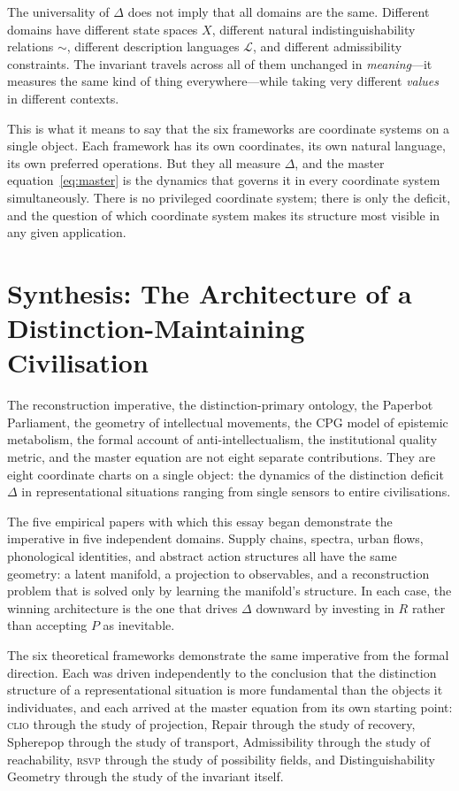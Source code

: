 \documentclass[12pt, letterpaper]{article}
\theoremstyle{remark}
\newcommand{\rsvp}{\textsc{rsvp}}
\newcommand{\clio}{\textsc{clio}}
\begin{document}
The universality of $\Delta$ does not imply that all domains are the same.
Different domains have different state spaces $X$, different natural
indistinguishability relations ${\sim}$, different description languages
$\mathcal{L}$, and different admissibility constraints.  The invariant
travels across all of them unchanged in \emph{meaning}---it measures the
same kind of thing everywhere---while taking very different \emph{values}
in different contexts.

This is what it means to say that the six frameworks are coordinate systems
on a single object.  Each framework has its own coordinates, its own natural
language, its own preferred operations.  But they all measure $\Delta$, and
the master equation~\eqref{eq:master} is the dynamics that governs it in
every coordinate system simultaneously.  There is no privileged coordinate
system; there is only the deficit, and the question of which coordinate system
makes its structure most visible in any given application.

\section{Synthesis: The Architecture of a Distinction-Maintaining Civilisation}

The reconstruction imperative, the distinction-primary ontology, the Paperbot
Parliament, the geometry of intellectual movements, the CPG model of epistemic
metabolism, the formal account of anti-intellectualism, the institutional
quality metric, and the master equation are not eight separate contributions.
They are eight coordinate charts on a single object: the dynamics of the
distinction deficit $\Delta$ in representational situations ranging from
single sensors to entire civilisations.

The five empirical papers with which this essay began demonstrate the
imperative in five independent domains.  Supply chains, spectra, urban flows,
phonological identities, and abstract action structures all have the same
geometry: a latent manifold, a projection to observables, and a reconstruction
problem that is solved only by learning the manifold's structure.  In each
case, the winning architecture is the one that drives $\Delta$ downward by
investing in $R$ rather than accepting $P$ as inevitable.

The six theoretical frameworks demonstrate the same imperative from the formal
direction.  Each was driven independently to the conclusion that the
distinction structure of a representational situation is more fundamental
than the objects it individuates, and each arrived at the master equation
from its own starting point: \clio{} through the study of projection, Repair
through the study of recovery, Spherepop through the study of transport,
Admissibility through the study of reachability, \rsvp{} through the study
of possibility fields, and Distinguishability Geometry through the study of
the invariant itself.
\end{document}
